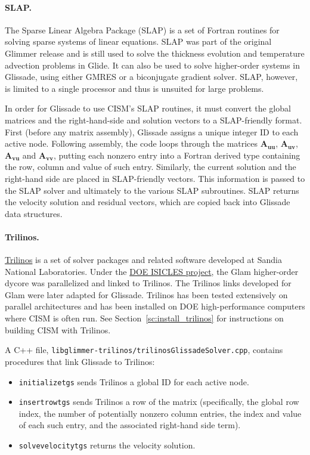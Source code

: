 {\paragraph{SLAP.}

The Sparse Linear Algebra Package (SLAP) is a set of Fortran routines for solving sparse systems of linear
equations. SLAP was part of the original Glimmer release and is still used to solve the thickness evolution
and temperature advection problems in Glide.  It can also be used to solve higher-order systems in Glissade,
using either GMRES or a biconjugate gradient solver.
SLAP, however, is limited to a single processor and thus is unsuited for large problems.

In order for Glissade to use CISM's SLAP routines, it must convert the global matrices and the 
right-hand-side and solution vectors to a SLAP-friendly format. First (before any matrix assembly),
Glissade assigns a unique integer ID to each active node.  Following assembly, the code loops through the matrices
$\mathbf{A_{uu}}$, $\mathbf{A_{uv}}$, $\mathbf{A_{vu}}$ and $\mathbf{A_{vv}}$, putting each nonzero entry into a Fortran derived type containing
the row, column and value of such entry.  Similarly, the current solution and the right-hand side are placed
in SLAP-friendly vectors. This information is passed to the SLAP solver
and ultimately to the various SLAP subroutines.  SLAP returns the velocity solution
and residual vectors, which are copied back into Glissade data structures.

\paragraph{Trilinos.}

\href{http://trilinos.org}{Trilinos} is a set of solver packages and related software developed at 
Sandia National Laboratories. Under the 
\href{http://www.csm.ornl.gov/ISICLES/}{DOE ISICLES project},
the Glam higher-order dycore was parallelized and linked to Trilinos.  The Trilinos links
developed for Glam were later adapted for Glissade.  Trilinos has been tested extensively on
parallel architectures and has been installed on DOE high-performance computers where 
CISM is often run.
See Section~\ref{sc:install_trilinos} for instructions on building CISM with Trilinos.

A C++ file, \texttt{libglimmer-trilinos/trilinosGlissadeSolver.cpp}, contains procedures that
link Glissade to Trilinos:

\begin{itemize}
\item \texttt{initializetgs} sends Trilinos a global ID for each active node.
\item \texttt{insertrowtgs} sends Trilinos a row of the matrix (specifically, the global row index, the number of
potentially nonzero column entries, the index and value of each such entry, and the associated right-hand side term).
\item \texttt{solvevelocitytgs} returns the velocity solution.
\end{itemize}

}
